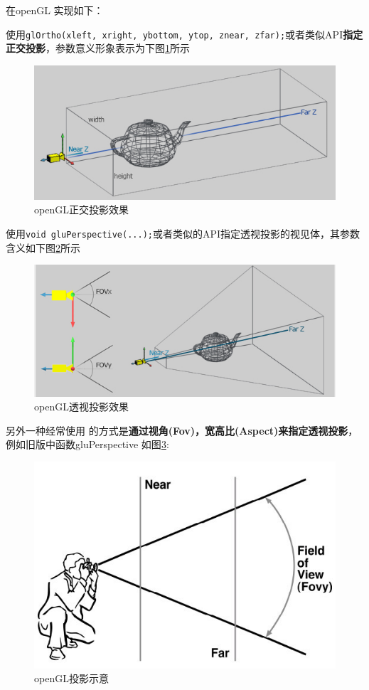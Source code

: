 \documentclass[UTF8,a4paper,8pt]{ctexbook}
\begin{document}
			在openGL 实现如下：
			
			使用\verb|glOrtho(xleft, xright, ybottom, ytop, znear, zfar);|或者类似API\textbf{指定正交投影}，参数意义形象表示为下图\ref{zhengjiao}所示
				\begin{figure}[htbp]
					\centering
					\includegraphics[scale = 0.7]{Ortho.png}
					\caption{openGL正交投影效果}
					\label{zhengjiao}
				\end{figure}
			
			使用\verb|void gluPerspective(...);|或者类似的API指定透视投影的视见体，其参数含义如下图\ref{toushi}所示
				\begin{figure}[htbp]
					\centering
					\includegraphics[scale = 0.7]{project3.png}
					\caption{openGL透视投影效果}
					\label{toushi}
				\end{figure}
				
			另外一种经常使用 的方式是\textbf{通过视角(Fov)，宽高比(Aspect)来指定透视投影}，例如旧版中函数gluPerspective 如图\ref{ts1}:
				\begin{figure}[htbp]
					\centering
					\includegraphics[scale = 0.7]{toushi.png}
					\caption{openGL投影示意}
					\label{ts1}
				\end{figure}
			
\end{document}
